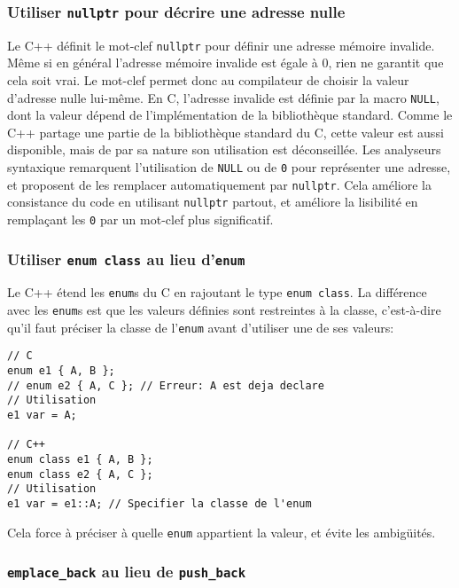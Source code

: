\subsubsection{\texorpdfstring{Utiliser \texttt{nullptr} pour décrire
une adresse nulle}{Utiliser nullptr pour décrire une adresse nulle}}

Le C++ définit le mot-clef \texttt{nullptr} pour définir une adresse
mémoire invalide. Même si en général l'adresse mémoire invalide est
égale à 0, rien ne garantit que cela soit vrai. Le mot-clef permet donc
au compilateur de choisir la valeur d'adresse nulle lui-même. En C,
l'adresse invalide est définie par la macro \texttt{NULL}, dont la
valeur dépend de l'implémentation de la bibliothèque standard. Comme le
C++ partage une partie de la bibliothèque standard du C, cette valeur
est aussi disponible, mais de par sa nature son utilisation est
déconseillée. Les analyseurs syntaxique remarquent l'utilisation de
\texttt{NULL} ou de \texttt{0} pour représenter une adresse, et
proposent de les remplacer automatiquement par \texttt{nullptr}. Cela
améliore la consistance du code en utilisant \texttt{nullptr} partout,
et améliore la lisibilité en remplaçant les \texttt{0} par un mot-clef
plus significatif.

\subsubsection{\texorpdfstring{Utiliser \texttt{enum\ class} au lieu
d'\texttt{enum}}{Utiliser enum class au lieu d'enum}}

Le C++ étend les \texttt{enum}s du C en rajoutant le type
\texttt{enum\ class}. La différence avec les \texttt{enum}s est que les
valeurs définies sont restreintes à la classe, c'est-à-dire qu'il faut
préciser la classe de l'\texttt{enum} avant d'utiliser une de ses
valeurs:

\lstset{language=C++}
\begin{lstlisting}
// C
enum e1 { A, B };
// enum e2 { A, C }; // Erreur: A est deja declare
// Utilisation
e1 var = A;

// C++
enum class e1 { A, B };
enum class e2 { A, C };
// Utilisation
e1 var = e1::A; // Specifier la classe de l'enum
\end{lstlisting}

Cela force à préciser à quelle \texttt{enum} appartient la valeur, et
évite les ambigüités.

\subsubsection{\texorpdfstring{\texttt{emplace\_back} au lieu de
\texttt{push\_back}}{emplace\_back au lieu de push\_back}}

